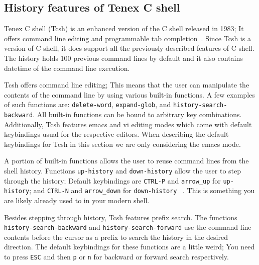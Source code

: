 \documentclass[thesis=M,english]{FITthesis}[2012/10/20]
\let\myCite\cite
\renewcommand\cite{\unskip~\myCite}
\begin{document}
\subsection{History features of Tenex C shell}
Tenex C shell (Tcsh) is an enhanced version of the C shell released in 1983; It offers command line editing and programmable tab completion\cite{dubois1995tcshusing}. Since Tcsh is a version of C shell, it does support all the previously described features of C shell. The history holds 100 previous command lines by default and it also contains datetime of the command line execution.

Tcsh offers command line editing; This means that the user can manipulate the contents of the command line by using various built-in functions. A few examples of such functions are: \verb|delete-word|, \verb|expand-glob|, and \verb|history-search-backward|. All built-in functions can be bound to arbitrary key combinations. Additionally, Tcsh features emacs and vi editing modes which come with default keybindings usual for the respective editors. When describing the default keybindings for Tcsh in this section we are only considering the emacs mode.

A portion of built-in functions allows the user to reuse command lines from the shell history. Functions \verb|up-history| and \verb|down-history| allow the user to step through the history; Default keybindings are \verb|CTRL-P| and \verb|arrow_up| for \verb|up-history|; and \verb|CTRL-N| and \verb|arrow_down| for  \verb|down-history| \cite{tcshman}. This is something you are likely already used to in your modern shell.


Besides stepping through history, Tcsh features prefix search. The functions \verb|history-search-backward|  and \verb|history-search-forward| use the command line contents before the cursor as a prefix to search the history in the desired direction. The default keybindings for these functions are a little weird; 
You need to press \verb|ESC| and then \verb|p| or \verb|n| for backward or forward search respectively. 
\end{document}

